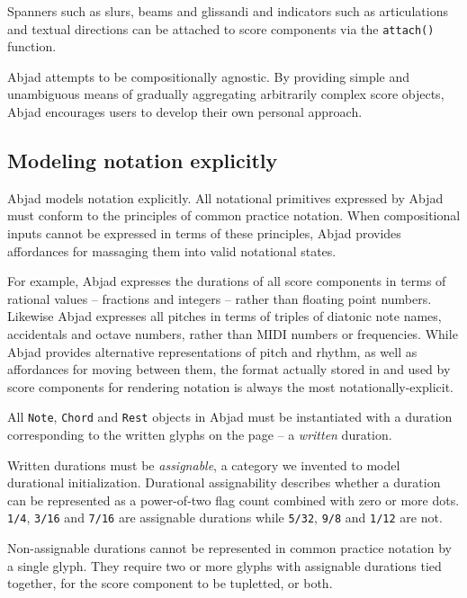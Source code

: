 Spanners such as slurs, beams and glissandi and indicators such as
articulations and textual directions can be attached to score components via
the \texttt{attach()} function.

Abjad attempts to be compositionally agnostic. By providing simple and
unambiguous means of gradually aggregating arbitrarily complex score objects,
Abjad encourages users to develop their own personal approach.

\subsection{Modeling notation explicitly}

Abjad models notation explicitly. All notational primitives expressed by Abjad
must conform to the principles of common practice notation. When compositional
inputs cannot be expressed in terms of these principles, Abjad provides
affordances for massaging them into valid notational states.

For example, Abjad expresses the durations of all score components in terms of
rational values -- fractions and integers -- rather than floating point
numbers. Likewise Abjad expresses all pitches in terms of triples of diatonic
note names, accidentals and octave numbers, rather than MIDI numbers or
frequencies. While Abjad provides alternative representations of pitch and
rhythm, as well as affordances for moving between them, the format actually
stored in and used by score components for rendering notation is always the
most notationally-explicit.


All \texttt{Note}, \texttt{Chord} and \texttt{Rest} objects in Abjad must be
instantiated with a duration corresponding to the written glyphs on the page --
a \emph{written} duration.

Written durations must be \emph{assignable}, a category we invented to model
durational initialization. Durational assignability describes whether a
duration can be represented as a power-of-two flag count combined with zero or
more dots. \texttt{1/4}, \texttt{3/16} and \texttt{7/16} are assignable
durations while \texttt{5/32}, \texttt{9/8} and \texttt{1/12} are not.

Non-assignable durations cannot be represented in common practice notation by a
single glyph. They require two or more glyphs with assignable durations tied
together, for the score component to be tupletted, or both.

